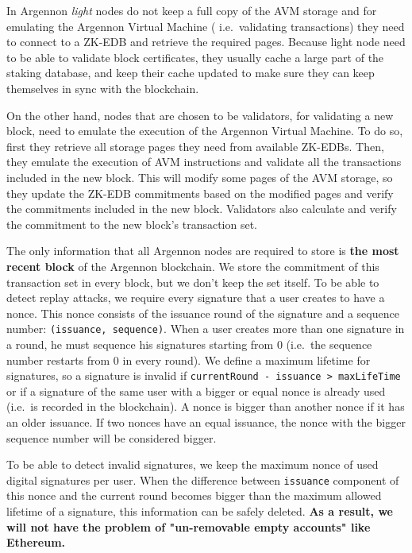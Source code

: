 

In Argennon \emph{light} nodes do not keep a full copy of the AVM storage and for emulating the Argennon Virtual Machine
( i.e.~validating transactions) they need to connect to a ZK-EDB and retrieve the required pages.
Because light node need to be able to validate block certificates, they usually cache a large part of the staking
database, and keep their cache updated to make sure they can keep themselves in sync with the blockchain.


On the other hand, nodes that are chosen to be validators, for validating a new block, need to emulate the
execution of the Argennon Virtual Machine. To do so, first they retrieve all storage pages they
need from available ZK-EDBs. Then, they emulate the execution of AVM instructions and validate all the
transactions included in the new block. This will modify some pages of the AVM storage, so they update the ZK-EDB
commitments based on the modified pages and verify the commitments included in the new block. Validators also
calculate and verify the commitment to the new block's transaction set.



The only information that all Argennon nodes are required to store is \textbf{the most recent block} of the Argennon
blockchain.
We store the commitment of this
transaction set in every block, but we don't keep the set itself. To be able to detect replay attacks, we require
every signature that a user creates to have a nonce. This nonce consists of the issuance round of the signature
and a sequence number: \texttt{(issuance,\ sequence)}. When a user creates more than one signature in a round, he
must sequence his signatures starting from 0 (i.e.~the sequence number restarts from 0 in every round). We define
a maximum lifetime for signatures, so a signature is invalid if \texttt{currentRound - issuance > maxLifeTime} or
if a signature of the same user with a bigger or equal nonce is already used
(i.e.~is recorded in the blockchain). A nonce is bigger than another nonce if it has an older issuance. If two
nonces have an equal issuance, the nonce with the bigger sequence number will be considered bigger.

To be able to detect invalid signatures, we keep the maximum nonce of used digital signatures per user. When the
difference between \texttt{issuance} component of this nonce and the current round becomes bigger than the
maximum allowed lifetime of a signature, this information can be safely deleted. \textbf{As a result, we will not
have the problem of "un-removable empty accounts" like Ethereum.}



